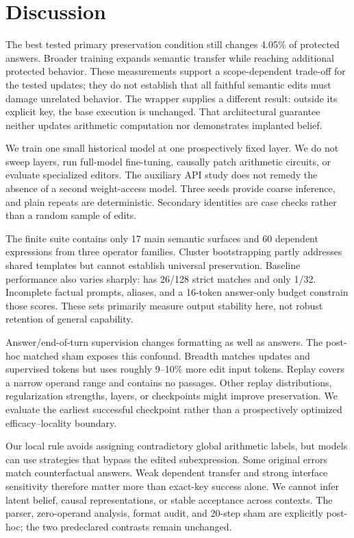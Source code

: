 \section{Discussion}
\label{sec:discussion}
 The best tested primary preservation condition still changes 4.05\% of protected answers. Broader training expands semantic transfer while reaching additional protected behavior. These measurements support a scope-dependent trade-off for the tested updates; they do not establish that all faithful semantic edits must damage unrelated behavior. The wrapper supplies a different result: outside its explicit key, the base execution is unchanged. That architectural guarantee neither updates arithmetic computation nor demonstrates implanted belief.

 We train one small historical model at one prospectively fixed layer. We do not sweep layers, run full-model fine-tuning, causally patch arithmetic circuits, or evaluate specialized editors. The auxiliary API study does not remedy the absence of a second weight-access model. Three seeds provide coarse inference, and plain \ft repeats are deterministic. Secondary identities are case checks rather than a random sample of edits.

The finite suite contains only 17 main semantic surfaces and 60 dependent expressions from three operator families. Cluster bootstrapping partly addresses shared templates but cannot establish universal preservation. Baseline performance also varies sharply: \cfact has 26/128 strict matches and \gsm only 1/32. Incomplete factual prompts, aliases, and a 16-token answer-only budget constrain those scores. These sets primarily measure output stability here, not robust retention of general capability.

Answer/end-of-turn supervision changes formatting as well as answers. The post-hoc matched sham exposes this confound. Breadth matches updates and supervised tokens but uses roughly 9--10\% more edit input tokens. Replay covers a narrow operand range and contains no \wikitext passages. Other replay distributions, regularization strengths, layers, or checkpoints might improve preservation. We evaluate the earliest successful checkpoint rather than a prospectively optimized efficacy--locality boundary.

 Our local rule avoids assigning contradictory global arithmetic labels, but models can use strategies that bypass the edited subexpression. Some original errors match counterfactual answers. Weak dependent transfer and strong interface sensitivity therefore matter more than exact-key success alone. We cannot infer latent belief, causal representations, or stable acceptance across contexts. The parser, zero-operand analysis, format audit, and 20-step sham are explicitly post-hoc; the two predeclared contrasts remain unchanged.

